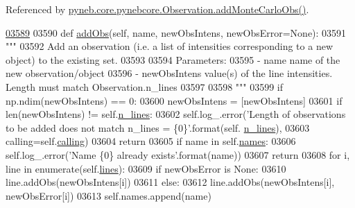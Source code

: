 Referenced by \hyperlink{pynebcore_8py_source_l04069}{pyneb.\-core.\-pynebcore.\-Observation.\-add\-Monte\-Carlo\-Obs()}.


\begin{DoxyCode}
\hypertarget{classpyneb_1_1core_1_1pynebcore_1_1_observation_l03589}{}\hyperlink{classpyneb_1_1core_1_1pynebcore_1_1_observation_a301e67ff50a467e97cd929039607a5d0}{03589} 
03590     \textcolor{keyword}{def }\hyperlink{classpyneb_1_1core_1_1pynebcore_1_1_observation_a301e67ff50a467e97cd929039607a5d0}{addObs}(self, name, newObsIntens, newObsError=None):
03591         \textcolor{stringliteral}{"""}
03592 \textcolor{stringliteral}{        Add an observation (i.e. a list of intensities corresponding to a new object) to the existing set.}
03593 \textcolor{stringliteral}{}
03594 \textcolor{stringliteral}{        Parameters:}
03595 \textcolor{stringliteral}{            - name            name of the new observation/object}
03596 \textcolor{stringliteral}{            - newObsIntens    value(s) of the line intensities. Length must match Observation.n\_lines}
03597 \textcolor{stringliteral}{                }
03598 \textcolor{stringliteral}{        """}
03599         \textcolor{keywordflow}{if} np.ndim(newObsIntens) == 0:
03600             newObsIntens = [newObsIntens]
03601         \textcolor{keywordflow}{if} len(newObsIntens) != self.\hyperlink{classpyneb_1_1core_1_1pynebcore_1_1_observation_a784301f3cabf9c7dbe4e7dcef0700ae8}{n\_lines}:
03602             self.log\_.error(\textcolor{stringliteral}{'Length of observations to be added does not match n\_lines = \{0\}'}.format(self.
      \hyperlink{classpyneb_1_1core_1_1pynebcore_1_1_observation_a784301f3cabf9c7dbe4e7dcef0700ae8}{n\_lines}),
03603                             calling=self.\hyperlink{classpyneb_1_1core_1_1pynebcore_1_1_observation_a2639fad9af4fefad20e4097295bd40e7}{calling})
03604             \textcolor{keywordflow}{return}
03605         \textcolor{keywordflow}{if} name \textcolor{keywordflow}{in} self.\hyperlink{classpyneb_1_1core_1_1pynebcore_1_1_observation_a3f365d0b1488b2eba300bf71caf23c17}{names}:
03606             self.log\_.error(\textcolor{stringliteral}{'Name \{0\} already exists'}.format(name))
03607             \textcolor{keywordflow}{return}
03608         \textcolor{keywordflow}{for} i, line \textcolor{keywordflow}{in} enumerate(self.\hyperlink{classpyneb_1_1core_1_1pynebcore_1_1_observation_a78332043ca9f290590edf6b8a1e5b767}{lines}):
03609             \textcolor{keywordflow}{if} newObsError \textcolor{keywordflow}{is} \textcolor{keywordtype}{None}:
03610                 line.addObs(newObsIntens[i])
03611             \textcolor{keywordflow}{else}:
03612                 line.addObs(newObsIntens[i], newObsError[i])
03613         self.names.append(name)

\end{DoxyCode}
